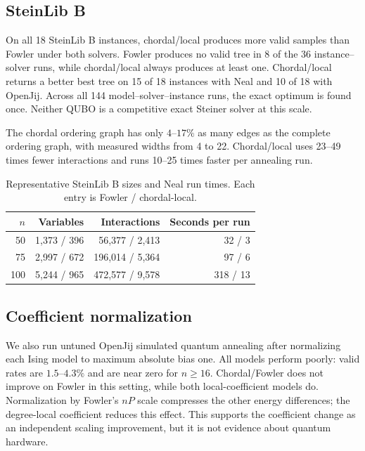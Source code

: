 \documentclass[10pt,a4paper]{article}
\begin{document}
\subsection{SteinLib B}

On all 18 SteinLib B instances, chordal/local produces more valid samples than
Fowler under both solvers. Fowler produces no valid tree in 8 of the 36
instance--solver runs, while chordal/local always produces at least one.
Chordal/local returns a better best tree on 15 of 18 instances with Neal and
10 of 18 with OpenJij. Across all 144 model--solver--instance runs, the exact
optimum is found once. Neither QUBO is a competitive exact Steiner solver at
this scale.

The chordal ordering graph has only $4$--$17\%$ as many edges as the complete
ordering graph, with measured widths from 4 to 22. Chordal/local uses 23--49
times fewer interactions and runs 10--25 times faster per annealing run.

\begin{table}[ht]
\centering
\caption{Representative SteinLib B sizes and Neal run times. Each entry is
Fowler / chordal-local.}
\label{tab:steinlib-size}
\begin{tabular}{rrrr}
\toprule
$n$ & Variables & Interactions & Seconds per run \\
\midrule
50  & 1,373 / 396 & 56,377 / 2,413 & 32 / 3 \\
75  & 2,997 / 672 & 196,014 / 5,364 & 97 / 6 \\
100 & 5,244 / 965 & 472,577 / 9,578 & 318 / 13 \\
\bottomrule
\end{tabular}
\end{table}

\subsection{Coefficient normalization}

We also run untuned OpenJij simulated quantum annealing after normalizing each
Ising model to maximum absolute bias one. All models perform poorly: valid
rates are $1.5$--$4.3\%$ and are near zero for $n\ge16$. Chordal/Fowler does
not improve on Fowler in this setting, while both local-coefficient models do.
Normalization by Fowler's $nP$ scale compresses the other energy differences;
the degree-local coefficient reduces this effect. This supports the
coefficient change as an independent scaling improvement, but it is not
evidence about quantum hardware.
\end{document}
